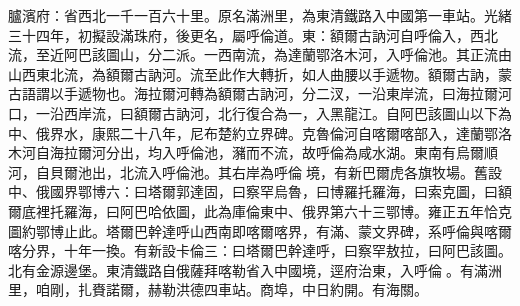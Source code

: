 \begin{pinyinscope}
臚濱府：省西北一千一百六十里。原名滿洲里，為東清鐵路入中國第一車站。光緒三十四年，初擬設滿珠府，後更名，屬呼倫道。東：額爾古訥河自呼倫入，西北流，至近阿巴該圖山，分二派。一西南流，為達蘭鄂洛木河，入呼倫池。其正流由山西東北流，為額爾古訥河。流至此作大轉折，如人曲腰以手遞物。額爾古訥，蒙古語謂以手遞物也。海拉爾河轉為額爾古訥河，分二汊，一沿東岸流，曰海拉爾河口，一沿西岸流，曰額爾古訥河，北行復合為一，入黑龍江。自阿巴該圖山以下為中、俄界水，康熙二十八年，尼布楚約立界碑。克魯倫河自喀爾喀部入，達蘭鄂洛木河自海拉爾河分出，均入呼倫池，瀦而不流，故呼倫為咸水湖。東南有烏爾順河，自貝爾池出，北流入呼倫池。其右岸為呼倫境，有新巴爾虎各旗牧場。舊設中、俄國界鄂博六：曰塔爾郭達固，曰察罕烏魯，曰博羅托羅海，曰索克圖，曰額爾底裡托羅海，曰阿巴哈依圖，此為庫倫東中、俄界第六十三鄂博。雍正五年恰克圖約鄂博止此。塔爾巴幹達呼山西南即喀爾喀界，有滿、蒙文界碑，系呼倫與喀爾喀分界，十年一換。有新設卡倫三：曰塔爾巴幹達呼，曰察罕敖拉，曰阿巴該圖。北有金源邊堡。東清鐵路自俄薩拜喀勒省入中國境，逕府治東，入呼倫。有滿洲里，咱剛，扎賚諾爾，赫勒洪德四車站。商埠，中日約開。有海關。


\end{pinyinscope}
